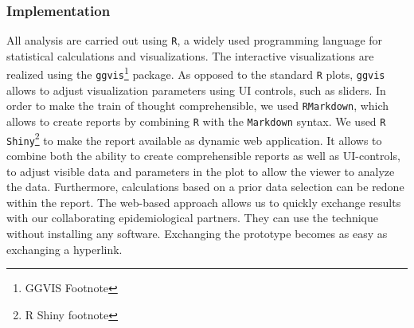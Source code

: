 \documentclass[a4paper,twoside]{style/article}
\begin{document}
\subsubsection{Implementation}
All analysis are carried out using \texttt{R}, a widely used programming language for statistical calculations and visualizations.
The interactive visualizations are realized using the \texttt{ggvis}\footnote{GGVIS Footnote} package.
As opposed to the standard \texttt{R} plots, \texttt{ggvis} allows to adjust visualization parameters using UI controls, such as sliders.
In order to make the train of thought comprehensible, we used \texttt{RMarkdown}, which allows to create reports by combining \texttt{R} with the \texttt{Markdown} syntax.
We used \texttt{R Shiny}\footnote{R Shiny footnote} to make the report available as dynamic web application.
It allows to combine both the ability to create comprehensible reports as well as UI-controls, to adjust visible data and parameters in the plot to allow the viewer to analyze the data.
Furthermore, calculations based on a prior data selection can be redone within the report.
The web-based approach allows us to quickly exchange results with our collaborating epidemiological partners.
They can use the technique without installing any software.
Exchanging the prototype becomes as easy as exchanging a hyperlink.
\end{document}
